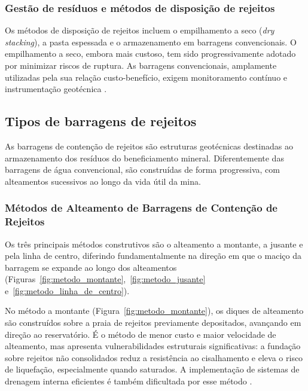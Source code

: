 \subsubsection{Gestão de resíduos e métodos de disposição de rejeitos}

Os métodos de disposição de rejeitos incluem o empilhamento a seco (\textit{dry stacking}), a pasta espessada e o armazenamento em barragens convencionais. O empilhamento a seco, embora mais custoso, tem sido progressivamente adotado por minimizar riscos de ruptura. As barragens convencionais, amplamente utilizadas pela sua relação custo-benefício, exigem monitoramento contínuo e instrumentação geotécnica \cite{carvalho2018, freire2020}.

\subsection{Tipos de barragens de rejeitos}
\label{subsec:tipos_barragens}

As barragens de contenção de rejeitos são estruturas geotécnicas destinadas ao armazenamento dos resíduos do beneficiamento mineral. Diferentemente das barragens de água convencional, são construídas de forma progressiva, com alteamentos sucessivos ao longo da vida útil da mina.

\subsubsection{Métodos de Alteamento de Barragens de Contenção de Rejeitos}

Os três principais métodos construtivos são o alteamento a montante, a jusante e pela linha de centro, diferindo fundamentalmente na direção em que o maciço da barragem se expande ao longo dos alteamentos (Figuras~\ref{fig:metodo_montante},~\ref{fig:metodo_jusante} e~\ref{fig:metodo_linha_de_centro}).


No método a montante (Figura~\ref{fig:metodo_montante}), os diques de alteamento são construídos sobre a praia de rejeitos previamente depositados, avançando em direção ao reservatório. É o método de menor custo e maior velocidade de alteamento, mas apresenta vulnerabilidades estruturais significativas: a fundação sobre rejeitos não consolidados reduz a resistência ao cisalhamento e eleva o risco de liquefação, especialmente quando saturados. A implementação de sistemas de drenagem interna eficientes é também dificultada por esse método \cite{araujo2006, ibram2016}.


